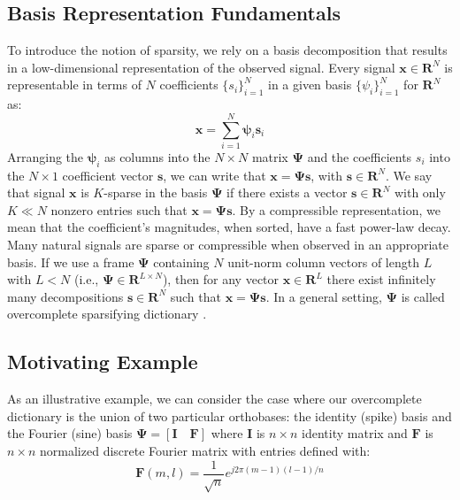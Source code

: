 \documentclass[journal]{IEEEtran}
\begin{document}
\subsection{Basis Representation Fundamentals}
To introduce the notion of sparsity, we rely on a basis decomposition that results in a low-dimensional representation of the observed signal. Every signal $\boldsymbol{x}\in\mathbf{R}^N$ is representable in terms of $N$ coefficients $\{s_i\}_{i=1}^N$ in a given basis $\{\psi_i\}_{i=1}^{N}$ for $\mathbf{R}^N$ as:
%
\begin{equation} \label{eq:basis_rep}
	\boldsymbol{x}= \sum\limits_{i=1}^N \boldsymbol{\psi}_i \boldsymbol{s}_i
\end{equation}
%
Arranging the $\boldsymbol{\psi}_i$ as columns into the $N\times N$ matrix $\boldsymbol{\Psi}$ and the coefficients $s_i$ into the $N\times 1$ coefficient vector $\boldsymbol{s}$, we can write that $\boldsymbol{x}=\boldsymbol{\Psi} \boldsymbol{s}$, with $\boldsymbol{s}\in\mathbf{R}^N$. We say that signal $\boldsymbol{x}$ is $K$-sparse in the basis $\boldsymbol{\Psi}$ if there exists a vector $\boldsymbol{s}\in\mathbf{R}^N$ with only $K\ll N$ nonzero entries such that $\boldsymbol{x}=\boldsymbol{\Psi} \boldsymbol{s}$. By a compressible representation, we mean that the coefficient's magnitudes, when sorted, have a fast power-law decay. Many natural signals are sparse or compressible when observed in an appropriate basis. If we use a frame $\boldsymbol{\Psi}$ containing $N$ unit-norm column vectors of length $L$ with $L<N$ (i.e., $\boldsymbol{\Psi}\in \mathbf{R}^{L\times N}$), then for any  vector $\boldsymbol{x}\in \mathbf{R}^L$ there exist infinitely many decompositions $\boldsymbol{s} \in \mathbf{R}^N$ such that $\boldsymbol{x}=\boldsymbol{\Psi} \boldsymbol{s}$. In a general setting, $\boldsymbol{\Psi}$ is called overcomplete sparsifying dictionary \cite{Duarte2011}.

\subsection{Motivating Example}

As an illustrative example, we can consider the case where our overcomplete dictionary is the union of two particular orthobases: the identity (spike) basis and the Fourier (sine) basis $\boldsymbol{\Psi} = [\boldsymbol{I}\quad \boldsymbol{F}]$ where $\boldsymbol{I}$ is $n\times n$ identity matrix and $\boldsymbol{F}$ is $n\times n$ normalized discrete Fourier matrix with entries defined with:
%
\begin{equation} \label{eq:fourier}
\boldsymbol{F}(m,l)=\frac{1}{\sqrt{n}} e^{j2\pi(m-1)(l-1)/n}
\end{equation}
\end{document}
